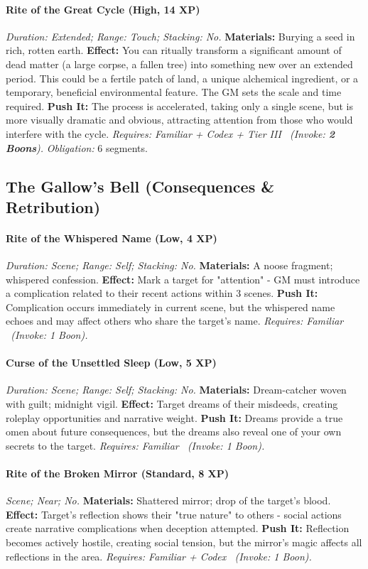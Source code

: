 \documentclass[12pt,twoside]{book}
\begin{document}
\paragraph{Rite of the Great Cycle (High, 14 XP)} \emph{Duration: Extended; Range: Touch; Stacking: No.}
\textbf{Materials:} Burying a seed in rich, rotten earth.
\textbf{Effect:} You can ritually transform a significant amount of dead matter (a large corpse, a fallen tree) into something new over an extended period. This could be a fertile patch of land, a unique alchemical ingredient, or a temporary, beneficial environmental feature. The GM sets the scale and time required.
\textbf{Push It:} The process is accelerated, taking only a single scene, but is more visually dramatic and obvious, attracting attention from those who would interfere with the cycle.
\emph{Requires: Familiar + Codex + Tier III \ (\textit{Invoke:} \textbf{2 Boons}).}
\emph{Obligation:} 6 segments.

\subsection{The Gallow's Bell (Consequences \& Retribution)}
\paragraph{Rite of the Whispered Name (Low, 4 XP)} \emph{Duration: Scene; Range: Self; Stacking: No.}
\textbf{Materials:} A noose fragment; whispered confession.
\textbf{Effect:} Mark a target for "attention" - GM must introduce a complication related to their recent actions within 3 scenes.
\textbf{Push It:} Complication occurs immediately in current scene, but the whispered name echoes and may affect others who share the target's name.
\emph{Requires: Familiar \ (\textit{Invoke:} 1 Boon).}
\paragraph{Curse of the Unsettled Sleep (Low, 5 XP)} \emph{Duration: Scene; Range: Self; Stacking: No.}
\textbf{Materials:} Dream-catcher woven with guilt; midnight vigil.
\textbf{Effect:} Target dreams of their misdeeds, creating roleplay opportunities and narrative weight.
\textbf{Push It:} Dreams provide a true omen about future consequences, but the dreams also reveal one of your own secrets to the target.
\emph{Requires: Familiar \ (\textit{Invoke:} 1 Boon).}
\paragraph{Rite of the Broken Mirror (Standard, 8 XP)} \emph{Scene; Near; No.}
\textbf{Materials:} Shattered mirror; drop of the target's blood.
\textbf{Effect:} Target's reflection shows their "true nature" to others - social actions create narrative complications when deception attempted.
\textbf{Push It:} Reflection becomes actively hostile, creating social tension, but the mirror's magic affects all reflections in the area.
\emph{Requires: Familiar + Codex \ (\textit{Invoke:} 1 Boon).}
\end{document}
